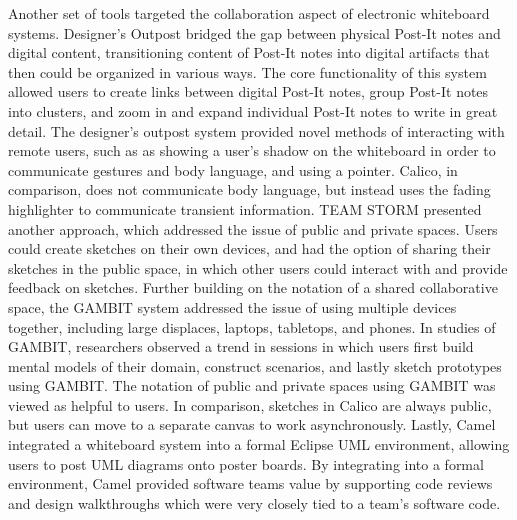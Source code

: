 Another set of tools targeted the collaboration aspect of electronic whiteboard systems. Designer's Outpost \citep{klemmer2001designers} bridged the gap between physical Post-It notes and digital content, transitioning content of Post-It notes into digital artifacts that then could be organized in various ways. The core functionality of this system allowed users to create links between digital Post-It notes, group Post-It notes into clusters, and zoom in and expand individual Post-It notes to write in great detail. The designer's outpost system provided novel methods of interacting with remote users, such as as showing a user's shadow on the whiteboard in order to communicate gestures and body language, and using a pointer. Calico, in comparison, does not communicate body language, but instead uses the fading highlighter to communicate transient information. TEAM STORM \citep{Hailpern} presented another approach, which addressed the issue of public and private spaces. Users could create sketches on their own devices, and had the option of sharing their sketches in the public space, in which other users could interact with and provide feedback on sketches. Further building on the notation of a shared collaborative space, the GAMBIT \cite{Sangiorgi:2012:GAM:2305484.2305527} system addressed the issue of using multiple devices together, including large displaces, laptops, tabletops, and phones. In studies of GAMBIT, researchers observed a trend in sessions in which users first build mental models of their domain, construct scenarios, and lastly sketch prototypes using GAMBIT. The notation of public and private spaces using GAMBIT was viewed as helpful to users. In comparison, sketches in Calico are always public, but users can move to a separate canvas to work asynchronously. Lastly, Camel \cite{cataldo2009camel} integrated a whiteboard system into a formal Eclipse UML environment, allowing users to post UML diagrams onto poster boards. By integrating into a formal environment, Camel provided software teams value by supporting code reviews and design walkthroughs which were very closely tied to a team's software code. 

